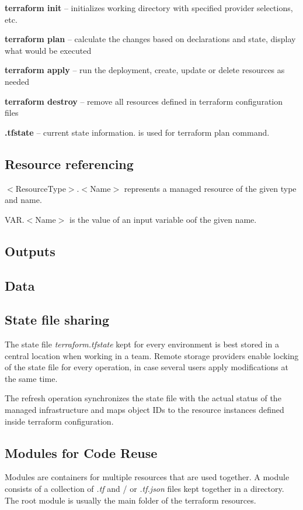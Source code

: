 \vspace{3mm}
\noindent
\textbf{terraform init} -- initializes working directory with specified provider selections, etc.

\noindent
\textbf{terraform plan} -- calculate the changes based on declarations and state, display what would be executed

\noindent
\textbf{terraform apply} -- run the deployment, create, update or delete resources as needed

\noindent
\textbf{terraform destroy} -- remove all resources defined in terraform configuration files

\vspace{3mm}
\noindent
\textbf{.tfstate} -- current state information. is used for terraform plan command.

\subsection{Resource referencing}
$<$ResourceType$>$.$<$Name$>$ represents a managed resource of the given type and name.

VAR.$<$Name$>$ is the value of an input variable oof the given name.

\subsection{Outputs}

\subsection{Data}

\subsection{State file sharing}
The state file \emph{terraform.tfstate} kept for every environment is best stored in a central location when working in a team.
Remote storage providers enable locking of the state file for every operation, in case several users apply modifications 
at the same time.

The refresh operation synchronizes the state file with the actual status of the managed infrastructure and maps object IDs to
the resource instances defined inside terraform configuration. 

\subsection{Modules for Code Reuse}
Modules are containers for multiple resources that are used together. 
A module consists of a collection of \emph{.tf} and / or \emph{.tf.json} files kept together in a directory.
 The root module is usually the main folder of the terraform resources. 